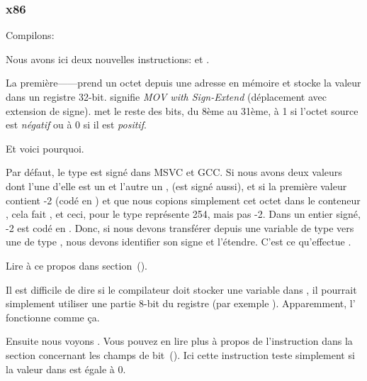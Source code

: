 \subsubsection{x86}


Compilons:




Nous avons ici deux nouvelles instructions: \MOVSX et \TEST.

\label{MOVSX}

La première---\MOVSX---prend un octet depuis une adresse en mémoire et stocke la
valeur dans un registre 32-bit. 
\MOVSX signifie \emph{MOV with Sign-Extend} (déplacement avec extension de signe).
\MOVSX met le reste des bits, du 8ème au 31ème, à 1 si l'octet source est \emph{négatif}
ou à 0 si il est \emph{positif}.

Et voici pourquoi.

Par défaut, le type \Tchar est signé dans MSVC et GCC. Si nous avons deux valeurs
dont l'une d'elle est un \Tchar et l'autre un \Tint, (\Tint est signé aussi), et
si la première valeur contient -2 (codé en ) et que nous copions simplement
cet octet dans le conteneur \Tint, cela fait , et ceci, pour le type
\Tint représente 254, mais pas -2. Dans un entier signé, -2 est codé en .
Donc, si nous devons transférer  depuis une variable de type \Tchar vers
une de type \Tint, nous devons identifier son signe et l'étendre. C'est ce qu'effectue
\MOVSX.

Lire à ce propos dans \q{\emph{\SignedNumbersSectionName}} section~().

Il est difficile de dire si le compilateur doit stocker une variable \Tchar dans
\EDX, il pourrait simplement utiliser une partie 8-bit du registre (par exemple \DL).
Apparemment, l' fonctionne comme
ça.


Ensuite nous voyons .
Vous pouvez en lire plus à propos de l'instruction \TEST dans la section concernant
les champs de bit~().
Ici cette instruction teste simplement si la valeur dans \EDX est égale à 0.


